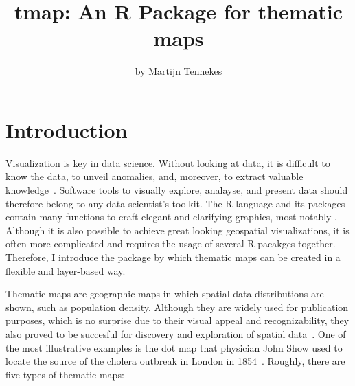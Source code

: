 \title{tmap: An R Package for thematic maps}
\author{by Martijn Tennekes}

\maketitle




\section{Introduction}

Visualization is key in data science. Without looking at data, it is difficult to know the data, to unveil anomalies, and, moreover, to extract valuable knowledge~\citep{tufte83}. Software tools to visually explore, analayse, and present data should therefore belong to any data scientist's toolkit. The R language and its packages contain many functions to craft elegant and clarifying graphics, most notably \citep{ggplot2}. Although it is also possible to achieve great looking geospatial visualizations, it is often more complicated and requires the usage of several R pacakges together. Therefore, I introduce the  package by which thematic maps can be created in a flexible and layer-based way.

Thematic maps are geographic maps in which spatial data distributions are shown, such as population density. Although they are widely used for publication purposes, which is no surprise due to their visual appeal and recognizability, they also proved to be succesful for discovery and exploration of spatial data~\citep{friendly95}. One of the most illustrative examples is the dot map that physician John Show used to locate the source of the cholera outbreak in London in 1854~\citep{snow1855}. Roughly, there are five types of thematic maps:

